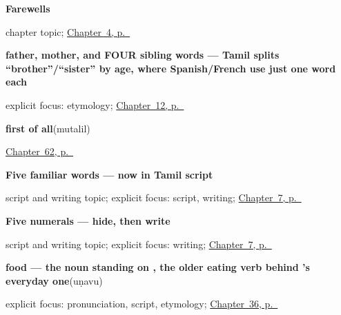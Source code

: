 \noindent\begin{minipage}[t]{\linewidth}
\raggedright
\textbf{Farewells}\par
\footnotesize chapter topic; \hyperref[ch:farewells]{Chapter~4, p.~\pageref*{ch:farewells}}
\end{minipage}\par\smallskip

\noindent\begin{minipage}[t]{\linewidth}
\raggedright
\textbf{father, mother, and FOUR sibling words — Tamil splits \textquotedblleft{}brother\textquotedblright{}/\textquotedblleft{}sister\textquotedblright{} by age, where Spanish/French use just one word each}\enspace\emph{     }\par
\footnotesize explicit focus: etymology; \hyperref[ch:ta-family]{Chapter~12, p.~\pageref*{ch:ta-family}}
\end{minipage}\par\smallskip

\noindent\begin{minipage}[t]{\linewidth}
\raggedright
\textbf{first of all}\enspace\emph{}\enspace(mutalil)\par
\footnotesize \hyperref[ch:ta-only-and-still]{Chapter~62, p.~\pageref*{ch:ta-only-and-still}}
\end{minipage}\par\smallskip

\noindent\begin{minipage}[t]{\linewidth}
\raggedright
\textbf{Five familiar words — now in Tamil script}\par
\footnotesize script and writing topic; explicit focus: script, writing; \hyperref[ch:ta-numbers-one-to-ten]{Chapter~7, p.~\pageref*{ch:ta-numbers-one-to-ten}}
\end{minipage}\par\smallskip

\noindent\begin{minipage}[t]{\linewidth}
\raggedright
\textbf{Five numerals — hide, then write}\par
\footnotesize script and writing topic; explicit focus: writing; \hyperref[ch:ta-numbers-one-to-ten]{Chapter~7, p.~\pageref*{ch:ta-numbers-one-to-ten}}
\end{minipage}\par\smallskip

\noindent\begin{minipage}[t]{\linewidth}
\raggedright
\textbf{food — the noun standing on , the older eating verb behind 's everyday one}\enspace\emph{}\enspace(uṇavu)\par
\footnotesize explicit focus: pronunciation, script, etymology; \hyperref[ch:ta-what-you-are-offered]{Chapter~36, p.~\pageref*{ch:ta-what-you-are-offered}}
\end{minipage}\par\smallskip

